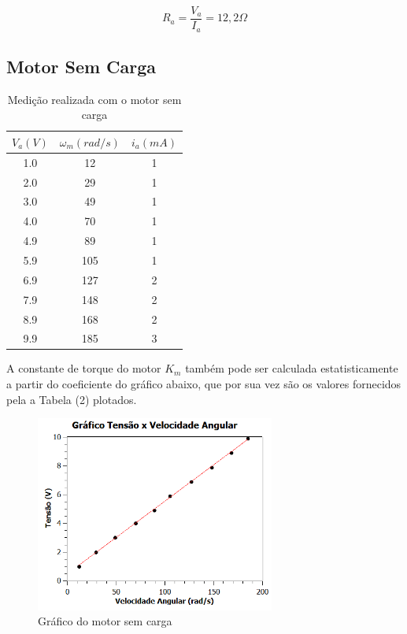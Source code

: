 \documentclass[12pt]{article}
\begin{document}
\begin{equation}
    R_a = \frac{V_a}{I_a} = 12,2 \Omega
\end{equation}

\subsection{Motor Sem Carga}
\begin{table}[H]
\centering
\begin{tabular}{c c c} 
 \hline
 $V_a(V)$ & $\omega_m(rad/s)$ & $i_a(mA)$ \\ 
 \hline
 1.0 & 12 & 1 \\ 
 2.0 & 29 & 1 \\
 3.0 & 49 & 1 \\
 4.0 & 70 & 1\\
 4.9 & 89 & 1\\
 5.9 & 105 & 1\\
 6.9 & 127 & 2\\
 7.9 & 148 & 2\\
 8.9 & 168 & 2\\
 9.9 & 185 & 3\\
 \hline
\end{tabular}
\caption{Medição realizada com o motor sem carga}
\label{table:data2}
\end{table}

\quad A constante de torque do motor $K_m$ também pode ser calculada estatisticamente a partir do coeficiente do gráfico abaixo, que por sua vez são os valores fornecidos pela a Tabela (2) plotados.

\begin{figure}[H] %
    \centering
    \includegraphics[width = 0.7\textwidth]{GRÁFICO 02.png}
    \caption{Gráfico do motor sem carga}
    \label{fig:mesh4}
\end{figure}
\end{document}
